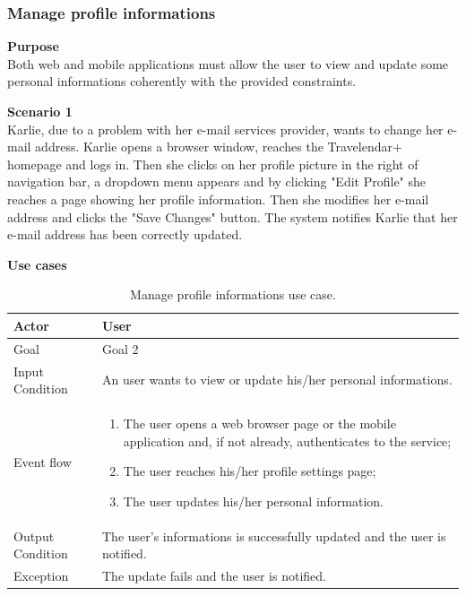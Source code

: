 \documentclass{article}
\begin{document}
	\subsubsection{Manage profile informations}
	
	\bigskip
	\noindent
	\textbf{Purpose} \\
	Both web and mobile applications must allow the user to view and update some personal informations coherently with the provided constraints.
	
	\bigskip
	\noindent
	\textbf{Scenario 1} \\
	Karlie, due to a problem with her e-mail services provider, wants to change her e-mail address. Karlie opens a browser window, reaches the Travelendar+ homepage and logs in. Then she clicks on her profile picture in the right of navigation bar, a dropdown menu appears and by clicking "Edit Profile" she reaches a page showing her profile information. Then she modifies her e-mail address and clicks the "Save Changes" button. The system notifies Karlie that her e-mail address has been correctly updated.
	
	\bigskip
	\noindent
	\textbf{Use cases} \\
	
	\begin{table}[htp]
	\caption{Manage profile informations use case.}
		\begin{center}
    			\begin{tabular}{p{}|p{}}

   			 	\hline
    				Actor & User \\ \hline
    				Goal & Goal 2 \\ \hline
    				Input Condition & An user wants to view or update his/her personal informations. \\ \hline
    				Event flow & 
				\begin{enumerate}
  					\item The user opens a web browser page or the mobile application and, if not already, authenticates to the service;
  					\item The user reaches his/her profile settings page;
  					\item The user updates his/her personal information.
 				 \end{enumerate} \\ \hline
    				Output Condition & The user's informations is successfully updated and the user is notified. \\ \hline
    				Exception & The update fails and the user is notified.\\
    				\hline
    			\end{tabular}
		\end{center}
	\end{table}
	
\end{document}
